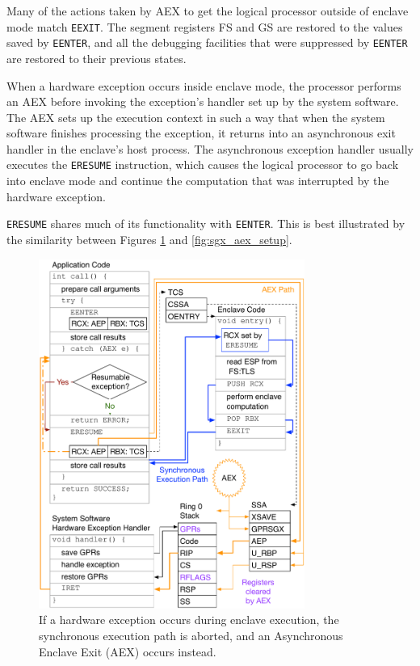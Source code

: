 Many of the actions taken by AEX to get the logical processor outside of
enclave mode match \texttt{EEXIT}. The segment registers FS and GS are restored
to the values saved by \texttt{EENTER}, and all the debugging facilities that
were suppressed by \texttt{EENTER} are restored to their previous states.


\label{sec:sgx_eresume}

When a hardware exception occurs inside enclave mode, the processor performs
an AEX before invoking the exception's handler set up by the system software.
The AEX sets up the execution context in such a way that when the system
software finishes processing the exception, it returns into an asynchronous
exit handler in the enclave's host process. The asynchronous exception handler
usually executes the \texttt{ERESUME} instruction, which causes the logical
processor to go back into enclave mode and continue the computation that was
interrupted by the hardware exception.

\texttt{ERESUME} shares much of its functionality with \texttt{EENTER}. This is
best illustrated by the similarity between Figures
\ref{fig:sgx_aex_eresume} and \ref{fig:sgx_aex_setup}.

\begin{figure}[hbt]
  \centering
  \includegraphics[width=87mm]{figures/sgx_aex_eresume.pdf}
  \caption{
    If a hardware exception occurs during enclave execution, the synchronous
    execution path is aborted, and an Asynchronous Enclave Exit (AEX) occurs
    instead.
  }
  \label{fig:sgx_aex_eresume}
\end{figure}

